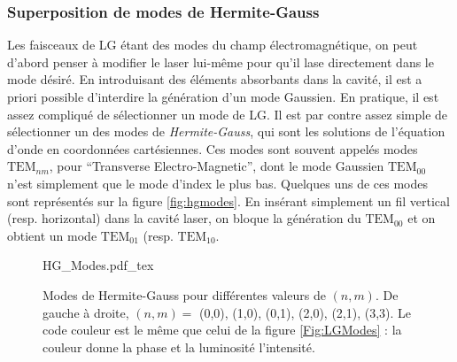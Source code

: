 \subsubsection{Superposition de modes de Hermite-Gauss}
\label{sec:hg_modes}
Les faisceaux de LG étant des modes du champ électromagnétique, on peut d'abord penser à modifier le laser lui-même pour qu'il lase directement dans le mode désiré. En introduisant des éléments absorbants dans la cavité, il est a priori possible d'interdire la génération d'un mode Gaussien. En pratique, il est assez compliqué de sélectionner un mode de LG. Il est par contre assez simple de sélectionner un des modes de \textit{Hermite-Gauss}, qui sont les solutions de l'équation d'onde en coordonnées cartésiennes. Ces modes sont souvent appelés modes $\mbox{TEM}_{nm}$, pour ``Transverse Electro-Magnetic'', dont le mode Gaussien $\mbox{TEM}_{00}$ n'est simplement que le mode d'index le plus bas. Quelques uns de ces modes sont représentés sur la figure \ref{fig:hgmodes}. En insérant simplement un fil vertical (resp. horizontal) dans la cavité laser, on bloque la génération du $\mbox{TEM}_{00}$ et on obtient un mode $\mbox{TEM}_{01}$ (resp. $\mbox{TEM}_{10}$.

\begin{figure}[!ht]
\centering
\def\svgwidth{\columnwidth}
{HG_Modes.pdf_tex}
\caption{Modes de Hermite-Gauss pour différentes valeurs de $(n,m)$. De gauche à droite, $(n,m) =$ (0,0), (1,0), (0,1), (2,0), (2,1), (3,3). Le code couleur est le même que celui de la figure \ref{Fig:LGModes} : la couleur donne la phase et la luminosité l'intensité.}
\label{Fig:hgmodes}
\end{figure}


